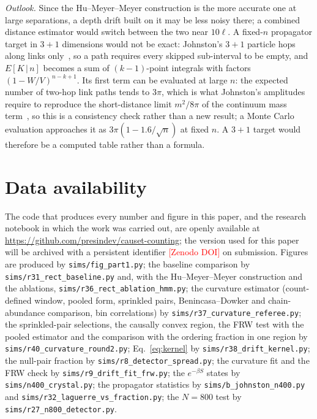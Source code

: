 \documentclass[prd,twocolumn,superscriptaddress,nofootinbib,amsmath,amssymb,floatfix]{revtex4-2}
\newcommand{\pending}[1]{\textcolor{red}{[#1]}}
\begin{document}
\emph{Outlook.} Since the Hu--Meyer--Meyer construction is the more accurate one at large separations, a depth drift built on it may be less noisy there; a combined distance estimator would switch between the two near $10\ell$. A fixed-$n$ propagator target in $3+1$ dimensions would not be exact: Johnston's $3+1$ particle hops along links only~\cite{Johnston08}, so a path requires every skipped sub-interval to be empty, and $E[K\,|\,n]$ becomes a sum of $(k-1)$-point integrals with factors $(1-W/V)^{n-k+1}$. Its first term can be evaluated at large $n$: the expected number of two-hop link paths tends to $3\pi$, which is what Johnston's amplitudes require to reproduce the short-distance limit $m^2/8\pi$ of the continuum mass term~\cite{Johnston08}, so this is a consistency check rather than a new result; a Monte Carlo evaluation approaches it as $3\pi(1-1.6/\sqrt n)$ at fixed $n$. A $3+1$ target would therefore be a computed table rather than a formula.

\section*{Data availability}
The code that produces every number and figure in this paper, and the research notebook in which the work was carried out, are openly available at \url{https://github.com/presindev/causet-counting}; the version used for this paper will be archived with a persistent identifier \pending{Zenodo DOI} on submission. Figures are produced by \texttt{sims/fig\_part1.py}; the baseline comparison by \texttt{sims/r31\_rect\_baseline.py} and, with the Hu--Meyer--Meyer construction and the ablations, \texttt{sims/r36\_rect\_ablation\_hmm.py}; the curvature estimator (count-defined window, pooled form, sprinkled pairs, Benincasa--Dowker and chain-abundance comparison, bin correlations) by \texttt{sims/r37\_curvature\_referee.py}; the sprinkled-pair selections, the causally convex region, the FRW test with the pooled estimator and the comparison with the ordering fraction in one region by \texttt{sims/r40\_curvature\_round2.py}; Eq.~\eqref{eq:kernel} by \texttt{sims/r38\_drift\_kernel.py}; the null-pair fraction by \texttt{sims/r8\_detector\_spread.py}; the curvature fit and the FRW check by \texttt{sims/r9\_drift\_fit\_frw.py}; the $e^{-\beta S}$ states by \texttt{sims/n400\_crystal.py}; the propagator statistics by \texttt{sims/b\_johnston\_n400.py} and \texttt{sims/r32\_laguerre\_vs\_fraction.py}; the $N=800$ test by \texttt{sims/r27\_n800\_detector.py}.
\end{document}
